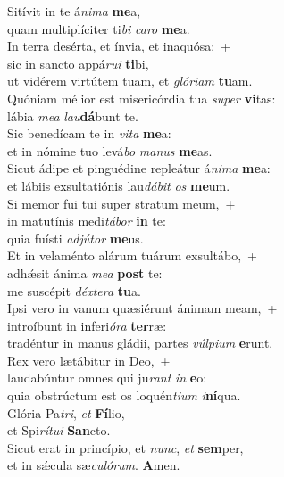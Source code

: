 \evenverse Sitívit in te á\textit{ni}\textit{ma} \textbf{me}a,~\*\\
\evenverse quam multiplíciter ti\textit{bi} \textit{ca}\textit{ro} \textbf{me}a.\\
\oddverse In terra desérta, et ínvia, et inaquósa:~+\\
\oddverse  sic in sancto appá\textit{ru}\textit{i} \textbf{ti}bi,~\*\\
\oddverse ut vidérem virtútem tuam, et \textit{gló}\textit{ri}\textit{am} \textbf{tu}am.\\
\evenverse Quóniam mélior est misericórdia tua \textit{su}\textit{per} \textbf{vi}tas:~\*\\
\evenverse lábia \textit{me}\textit{a} \textit{lau}\textbf{dá}bunt te.\\
\oddverse Sic benedícam te in \textit{vi}\textit{ta} \textbf{me}a:~\*\\
\oddverse et in nómine tuo levá\textit{bo} \textit{ma}\textit{nus} \textbf{me}as.\\
\evenverse Sicut ádipe et pinguédine repleátur á\textit{ni}\textit{ma} \textbf{me}a:~\*\\
\evenverse et lábiis exsultatiónis lau\textit{dá}\textit{bit} \textit{os} \textbf{me}um.\\
\oddverse Si memor fui tui super stratum meum,~+\\
\oddverse  in matutínis medi\textit{tá}\textit{bor} \textbf{in} te:~\*\\
\oddverse quia fuísti \textit{ad}\textit{jú}\textit{tor} \textbf{me}us.\\
\evenverse Et in velaménto alárum tuárum exsultábo,~+\\
\evenverse  adhǽsit ánima \textit{me}\textit{a} \textbf{post} te:~\*\\
\evenverse me suscépit \textit{déx}\textit{te}\textit{ra} \textbf{tu}a.\\
\oddverse Ipsi vero in vanum quæsiérunt ánimam meam,~+\\
\oddverse  introíbunt in inferi\textit{ó}\textit{ra} \textbf{ter}ræ:~\*\\
\oddverse tradéntur in manus gládii, partes \textit{vúl}\textit{pi}\textit{um} \textbf{e}runt.\\
\evenverse Rex vero lætábitur in Deo,~+\\
\evenverse  laudabúntur omnes qui ju\textit{rant} \textit{in} \textbf{e}o:~\*\\
\evenverse quia obstrúctum est os loquén\textit{ti}\textit{um} \textit{i}\textbf{ní}qua.\\
\oddverse Glória Pa\textit{tri}, \textit{et} \textbf{Fí}lio,~\*\\
\oddverse et Spi\textit{rí}\textit{tu}\textit{i} \textbf{San}cto.\\
\evenverse Sicut erat in princípio, et \textit{nunc}, \textit{et} \textbf{sem}per,~\*\\
\evenverse et in sǽcula sæ\textit{cu}\textit{ló}\textit{rum}. \textbf{A}men.\\
